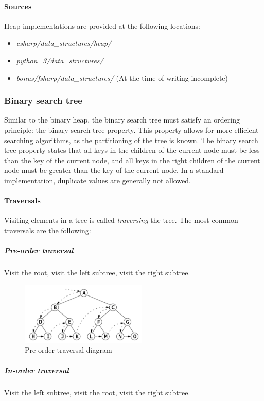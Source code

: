 \documentclass{article}
\begin{document}
\paragraph{Sources}
Heap implementations are provided at the following locations:
\begin{itemize}
\item{{\em csharp/data\_structures/heap/}}
\item{{\em python\_3/data\_structures/}}
\item{{\em bonus/fsharp/data\_structures/} (At the time of writing incomplete)}
\end{itemize}


\subsubsection{Binary search tree}
Similar to the binary heap, the binary search tree must satisfy an ordering principle:
the binary search tree property. This property allows for more efficient searching algorithms,
as the partitioning of the tree is known. The binary search tree property states that all keys in the
children of the current node must be less than the key of the current node, and all keys in the right
children of the current node must be greater than the key of the current node.
In a standard implementation, duplicate values are generally not allowed.


\newpage


\paragraph{Traversals}
Visiting elements in a tree is called {\em traversing} the tree. The most common traversals are the following:

\subparagraph{Pre-order traversal}
Visit the root, visit the left subtree, visit the right subtree.

\begin{figure}[H]
  \centering
  \includegraphics[width=6cm]{pre_order_traversal}
  \caption{Pre-order traversal diagram}
\end{figure}

\subparagraph{In-order traversal}
Visit the left subtree, visit the root, visit the right subtree.
\end{document}
